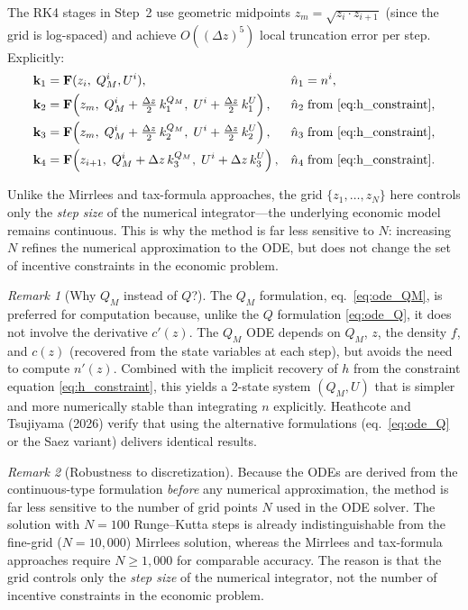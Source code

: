 \documentclass[12pt,a4paper]{article}
\theoremstyle{definition}
\theoremstyle{plain}
\theoremstyle{remark}
\newtheorem{remark}{Remark}[section]
\begin{document}
The RK4 stages in Step~2 use geometric midpoints $z_m = \sqrt{z_i \cdot z_{i+1}}$ (since the grid is log-spaced) and achieve $O((\Delta z)^5)$ local truncation error per step. Explicitly:
\begin{align*}
  \mathbf{k}_1 &= \mathbf{F}(z_i,\; Q_M^i, U^i), & \hat{n}_1 &= n^i, \\
  \mathbf{k}_2 &= \mathbf{F}\!\left(z_m,\; Q_M^i + \tfrac{\Delta z}{2}\,k_1^{Q_M},\; U^i + \tfrac{\Delta z}{2}\,k_1^{U}\right), & \hat{n}_2 &\;\text{from \eqref{eq:h_constraint}}, \\
  \mathbf{k}_3 &= \mathbf{F}\!\left(z_m,\; Q_M^i + \tfrac{\Delta z}{2}\,k_2^{Q_M},\; U^i + \tfrac{\Delta z}{2}\,k_2^{U}\right), & \hat{n}_3 &\;\text{from \eqref{eq:h_constraint}}, \\
  \mathbf{k}_4 &= \mathbf{F}\!\left(z_{i+1},\; Q_M^i + \Delta z\,k_3^{Q_M},\; U^i + \Delta z\,k_3^{U}\right), & \hat{n}_4 &\;\text{from \eqref{eq:h_constraint}}.
\end{align*}

Unlike the Mirrlees and tax-formula approaches, the grid $\{z_1, \ldots, z_N\}$ here controls only the \emph{step size} of the numerical integrator---the underlying economic model remains continuous. This is why the method is far less sensitive to $N$: increasing $N$ refines the numerical approximation to the ODE, but does not change the set of incentive constraints in the economic problem.

\begin{remark}[Why $Q_M$ instead of $Q$?]
The $Q_M$ formulation, eq.~\eqref{eq:ode_QM}, is preferred for computation because, unlike the $Q$ formulation \eqref{eq:ode_Q}, it does not involve the derivative $c'(z)$. The $Q_M$ ODE depends on $Q_M$, $z$, the density $f$, and $c(z)$ (recovered from the state variables at each step), but avoids the need to compute $n'(z)$. Combined with the implicit recovery of $h$ from the constraint equation \eqref{eq:h_constraint}, this yields a 2-state system $(Q_M, U)$ that is simpler and more numerically stable than integrating $n$ explicitly. Heathcote and Tsujiyama (2026) verify that using the alternative formulations (eq.~\eqref{eq:ode_Q} or the Saez variant) delivers identical results.
\end{remark}

\begin{remark}[Robustness to discretization]
Because the ODEs are derived from the continuous-type formulation \emph{before} any numerical approximation, the method is far less sensitive to the number of grid points $N$ used in the ODE solver. The solution with $N = 100$ Runge--Kutta steps is already indistinguishable from the fine-grid ($N = 10{,}000$) Mirrlees solution, whereas the Mirrlees and tax-formula approaches require $N \geq 1{,}000$ for comparable accuracy. The reason is that the grid controls only the \emph{step size} of the numerical integrator, not the number of incentive constraints in the economic problem.
\end{remark}
\end{document}
